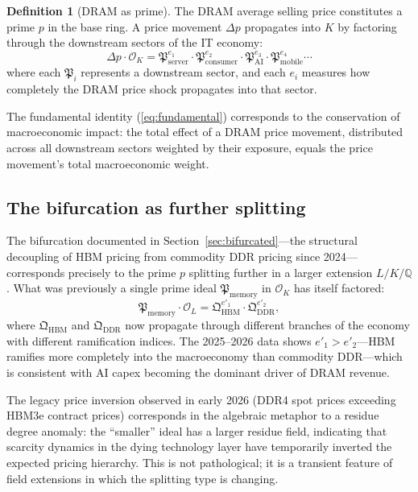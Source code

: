 \documentclass[12pt]{article}
\theoremstyle{definition}
\newtheorem{definition}[theorem]{Definition}
\newcommand{\Q}{\mathbb{Q}}
\newcommand{\cO}{\mathcal{O}}
\begin{document}
\begin{definition}[DRAM as prime]
\label{def:dram_prime}
The DRAM average selling price constitutes a prime $p$ in the base ring. A price movement $\Delta p$ propagates into $K$ by factoring through the downstream sectors of the IT economy:
\[
\Delta p \cdot \cO_K = \mathfrak{P}_{\text{server}}^{e_1} \cdot \mathfrak{P}_{\text{consumer}}^{e_2} \cdot \mathfrak{P}_{\text{AI}}^{e_3} \cdot \mathfrak{P}_{\text{mobile}}^{e_4} \cdots
\]
where each $\mathfrak{P}_i$ represents a downstream sector, and each $e_i$ measures how completely the DRAM price shock propagates into that sector.
\end{definition}

The fundamental identity (\ref{eq:fundamental}) corresponds to the conservation of macroeconomic impact: the total effect of a DRAM price movement, distributed across all downstream sectors weighted by their exposure, equals the price movement's total macroeconomic weight.

\subsection{The bifurcation as further splitting}

The bifurcation documented in Section~\ref{sec:bifurcated}---the structural decoupling of HBM pricing from commodity DDR pricing since 2024---corresponds precisely to the prime $p$ splitting further in a larger extension $L/K/\Q$. What was previously a single prime ideal $\mathfrak{P}_{\text{memory}}$ in $\cO_K$ has itself factored:
\begin{equation}
\label{eq:bifurcation}
\mathfrak{P}_{\text{memory}} \cdot \cO_L = \mathfrak{Q}_{\text{HBM}}^{e'_1} \cdot \mathfrak{Q}_{\text{DDR}}^{e'_2},
\end{equation}
where $\mathfrak{Q}_{\text{HBM}}$ and $\mathfrak{Q}_{\text{DDR}}$ now propagate through different branches of the economy with different ramification indices. The 2025--2026 data shows $e'_1 > e'_2$---HBM ramifies more completely into the macroeconomy than commodity DDR---which is consistent with AI capex becoming the dominant driver of DRAM revenue.

The legacy price inversion observed in early 2026 (DDR4 spot prices exceeding HBM3e contract prices) corresponds in the algebraic metaphor to a residue degree anomaly: the ``smaller'' ideal has a larger residue field, indicating that scarcity dynamics in the dying technology layer have temporarily inverted the expected pricing hierarchy. This is not pathological; it is a transient feature of field extensions in which the splitting type is changing.
\end{document}

